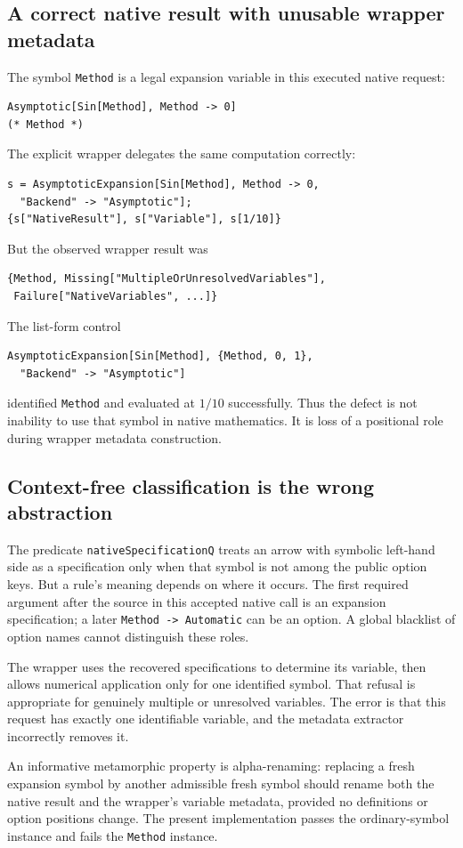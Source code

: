 \documentclass[11pt]{article}
\newcommand{\code}[1]{\texttt{#1}}
\begin{document}
\subsection{A correct native result with unusable wrapper metadata}
The symbol \code{Method} is a legal expansion variable in this executed native request:
\begin{lstlisting}
Asymptotic[Sin[Method], Method -> 0]
(* Method *)
\end{lstlisting}
The explicit wrapper delegates the same computation correctly:
\begin{lstlisting}
s = AsymptoticExpansion[Sin[Method], Method -> 0,
  "Backend" -> "Asymptotic"];
{s["NativeResult"], s["Variable"], s[1/10]}
\end{lstlisting}
But the observed wrapper result was
\begin{lstlisting}
{Method, Missing["MultipleOrUnresolvedVariables"],
 Failure["NativeVariables", ...]}
\end{lstlisting}
The list-form control
\begin{lstlisting}
AsymptoticExpansion[Sin[Method], {Method, 0, 1},
  "Backend" -> "Asymptotic"]
\end{lstlisting}
identified \code{Method} and evaluated at $1/10$ successfully. Thus the defect is not inability to use that symbol in native mathematics. It is loss of a positional role during wrapper metadata construction.

\subsection{Context-free classification is the wrong abstraction}
The predicate \code{nativeSpecificationQ} treats an arrow with symbolic left-hand side as a specification only when that symbol is not among the public option keys. But a rule's meaning depends on where it occurs. The first required argument after the source in this accepted native call is an expansion specification; a later \code{Method -> Automatic} can be an option. A global blacklist of option names cannot distinguish these roles.\cite{bridge}

The wrapper uses the recovered specifications to determine its variable, then allows numerical application only for one identified symbol. That refusal is appropriate for genuinely multiple or unresolved variables. The error is that this request has exactly one identifiable variable, and the metadata extractor incorrectly removes it.

An informative metamorphic property is alpha-renaming: replacing a fresh expansion symbol by another admissible fresh symbol should rename both the native result and the wrapper's variable metadata, provided no definitions or option positions change. The present implementation passes the ordinary-symbol instance and fails the \code{Method} instance.
\end{document}
